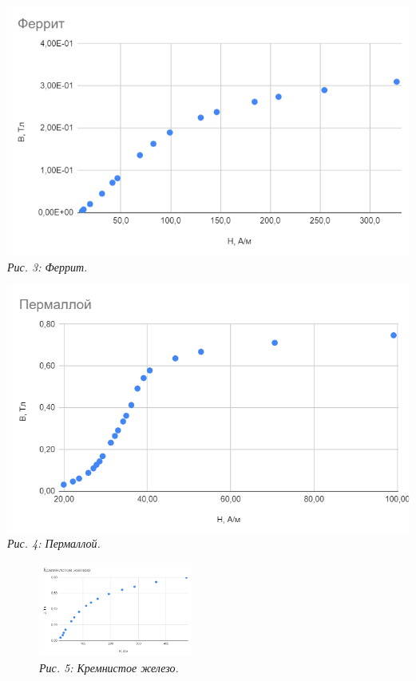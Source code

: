 \begin{minipage}[h!]{0.4\textwidth}
    \centering
    \includegraphics[width = \textwidth]{picks/ferrith.png} \\
    \textit{Рис. 3: Феррит.}
\end{minipage}\begin{minipage}[h!]{0.4\textwidth}
    \centering
    \includegraphics[width = \textwidth]{picks/permalloi.png} \\
    \textit{Рис. 4: Пермаллой.}
\end{minipage}

\begin{figure}[h!]
    \centering
    \includegraphics[width = 0.45\textwidth]{picks/silFerr.png} \\
    \textit{Рис. 5: Кремнистое железо.}
\end{figure}

